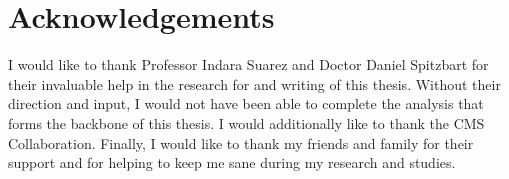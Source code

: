 \chapter*{Acknowledgements}
I would like to thank Professor Indara Suarez and Doctor Daniel Spitzbart for their invaluable help in the research for and writing of this thesis. Without their direction and input, I would not have been able to complete the analysis that forms the backbone of this thesis. I would additionally like to thank the CMS Collaboration. Finally, I would like to thank my friends and family for their support and for helping to keep me sane during my research and studies.